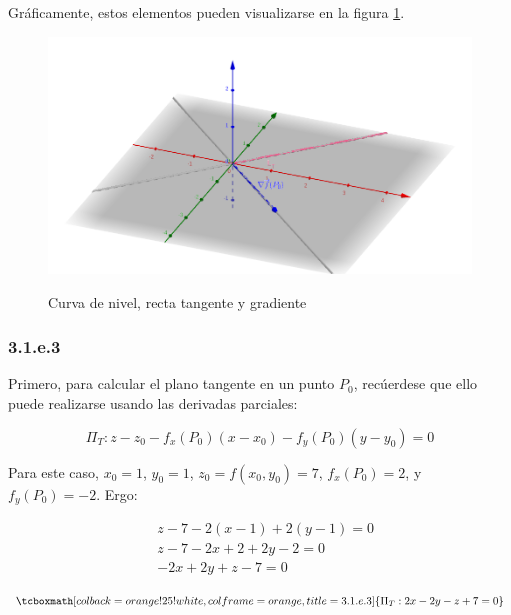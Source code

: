 \documentclass{article}
\begin{document}
Gráficamente, estos elementos pueden visualizarse en la figura \ref{fig:1-e-2-2}.

\begin{figure}[ht]
\caption{Curva de nivel, recta tangente y gradiente}
\includegraphics[scale=0.25]{img/ejercicios/3/1-e-2-2.png} 
\centering
\label{fig:1-e-2-2}
\end{figure}

\subsubsection*{3.1.e.3}
\label{subsubsec:3.1.e.3}

Primero, para calcular el plano tangente en un punto $P_0$, recúerdese que ello puede realizarse usando las derivadas parciales:

\begin{equation}
\Pi_T: z-z_0 - f_x(P_0) (x-x_0) - f_y(P_0) (y-y_0) = 0
\end{equation}

Para este caso, $x_0 = 1$, $y_0 = 1$, $z_0 = f(x_0,y_0) = 7$, $f_x(P_0) = 2$, y $f_y(P_0) = -2$. Ergo:

\begin{subequations}
\begin{align}
& z-7 - 2 (x-1) + 2 (y-1) = 0 \\
& z-7 -2x+2 +2y -2 = 0 \\
& -2x +2y +z -7 = 0
\end{align}
\end{subequations}

\begin{equation}
\tcboxmath[colback=orange!25!white,colframe=orange,title=3.1.e.3]
{
\Pi_T: 2x -2y -z +7 = 0
}
\end{equation}
\end{document}
